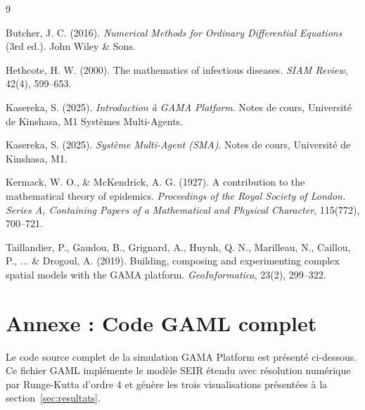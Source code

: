 \documentclass[11pt]{article}
\begin{document}

\begin{thebibliography}{9}

Butcher, J. C. (2016).
\emph{Numerical Methods for Ordinary Differential Equations} (3rd ed.).
John Wiley \& Sons.

Hethcote, H. W. (2000).
The mathematics of infectious diseases.
\emph{SIAM Review}, 42(4), 599--653.

Kasereka, S. (2025).
\emph{Introduction à GAMA Platform}.
Notes de cours, Université de Kinshasa, M1 Systèmes Multi-Agents.

Kasereka, S. (2025).
\emph{Système Multi-Agent (SMA)}.
Notes de cours, Université de Kinshasa, M1.

Kermack, W. O., \& McKendrick, A. G. (1927).
A contribution to the mathematical theory of epidemics.
\emph{Proceedings of the Royal Society of London. Series A, Containing Papers of a Mathematical and Physical Character}, 115(772), 700--721.

Taillandier, P., Gaudou, B., Grignard, A., Huynh, Q. N., Marilleau, N., Caillou, P., ... \& Drogoul, A. (2019).
Building, composing and experimenting complex spatial models with the GAMA platform.
\emph{GeoInformatica}, 23(2), 299--322.

\end{thebibliography}

\clearpage
\appendix

\section{Annexe : Code GAML complet}\label{annexe:code_gama}

Le code source complet de la simulation GAMA Platform est présenté ci-dessous. Ce fichier GAML implémente le modèle SEIR étendu avec résolution numérique par Runge-Kutta d'ordre 4 et génère les trois visualisations présentées à la section~\ref{sec:resultats}.
\end{document}
